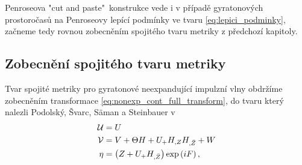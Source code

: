 Penroseova "cut and paste"\ konstrukce vede i v případě gyratonových prostoročasů na Penroseovy lepící podmínky ve tvaru \eqref{eq:lepici_podminky}, začneme tedy rovnou zobecněním
spojitého tvaru metriky z předchozí kapitoly.

\subsection{Zobecnění spojitého tvaru metriky}
Tvar spojité metriky pro gyratonové neexpandující impulzní vlny obdržíme zobecněním transformace \eqref{eq:nonexp_cont_full_transform},
do tvaru který nalezli Podolský, Švarc, Säman a Steinbauer v \cite{Podolsky_2017}
\begin{equation}
    \label{eq:gyraton_cont_transformation}
    \begin{split}
        \mathcal{U} &= U \\
        \mathcal{V} &= V + \Theta H + U_{+} H_{,Z} H_{,\bar{Z}} + W \\
        \eta &= \left(Z + U_{+} H_{,\bar{Z}}\right) \exp \left(i F \right),
    \end{split}
\end{equation}

